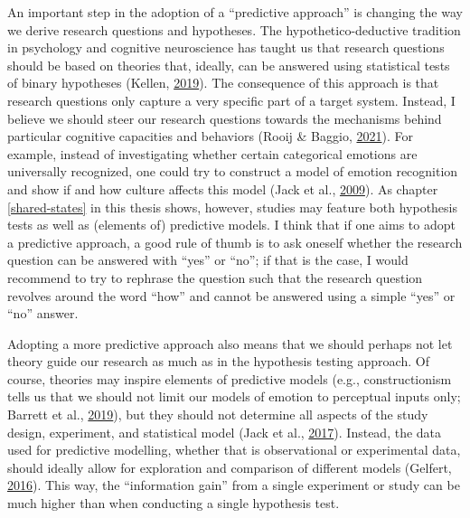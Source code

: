 \documentclass[12pt,american,a4paper,oneside,]{memoir} %
\begin{document}
An important step in the adoption of a ``predictive approach'' is changing the way we derive research questions and hypotheses. The hypothetico-deductive tradition in psychology and cognitive neuroscience has taught us that research questions should be based on theories that, ideally, can be answered using statistical tests of binary hypotheses (Kellen, \protect\hyperlink{ref-Kellen2019-af}{2019}). The consequence of this approach is that research questions only capture a very specific part of a target system. Instead, I believe we should steer our research questions towards the mechanisms behind particular cognitive capacities and behaviors (Rooij \& Baggio, \protect\hyperlink{ref-Van_Rooij2021-bk}{2021}). For example, instead of investigating whether certain categorical emotions are universally recognized, one could try to construct a model of emotion recognition and show if and how culture affects this model (Jack et al., \protect\hyperlink{ref-Jack2009-yy}{2009}). As chapter \ref{shared-states} in this thesis shows, however, studies may feature both hypothesis tests as well as (elements of) predictive models. I think that if one aims to adopt a predictive approach, a good rule of thumb is to ask oneself whether the research question can be answered with ``yes'' or ``no''; if that is the case, I would recommend to try to rephrase the question such that the research question revolves around the word ``how'' and cannot be answered using a simple ``yes'' or ``no'' answer.

Adopting a more predictive approach also means that we should perhaps not let theory guide our research as much as in the hypothesis testing approach. Of course, theories may inspire elements of predictive models (e.g., constructionism tells us that we should not limit our models of emotion to perceptual inputs only; Barrett et al., \protect\hyperlink{ref-Barrett2019-bc}{2019}), but they should not determine all aspects of the study design, experiment, and statistical model (Jack et al., \protect\hyperlink{ref-Jack2017-qp}{2017}). Instead, the data used for predictive modelling, whether that is observational or experimental data, should ideally allow for exploration and comparison of different models (Gelfert, \protect\hyperlink{ref-Gelfert2016-hd}{2016}). This way, the ``information gain'' from a single experiment or study can be much higher than when conducting a single hypothesis test.
\end{document}
